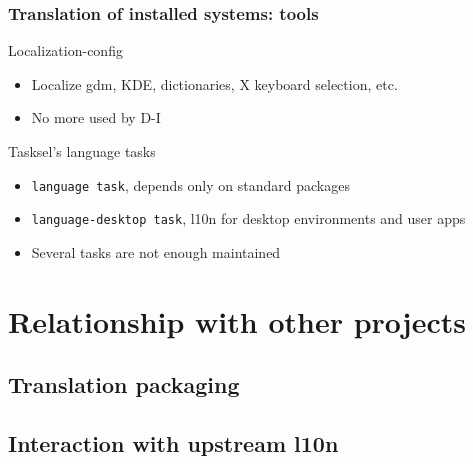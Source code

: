 \documentclass{beamer}
\begin{document}
\begin{frame}
  \frametitle{Translation of installed systems: tools}
	\begin{block}
		{Localization-config}
		\begin{itemize}
		\item
			Localize gdm, KDE, dictionaries, X keyboard selection, etc.
		\item
			No more used by D-I
		\end{itemize}
	\end{block}
	\begin{block}
		{Tasksel's language tasks}
		\begin{itemize}
		\item
			{\texttt{language task}}, depends only on standard packages
		\item
			{\texttt{language-desktop task}}, l10n for desktop environments and user apps
		\item
			{Several tasks are not enough maintained}
		\end{itemize}
	\end{block}
\end{frame}

\section{Relationship with other projects}

\subsection{Translation packaging}

\begin{frame}
  \frametitle{}
\end{frame}

\subsection{Interaction with upstream l10n}
\end{document}
